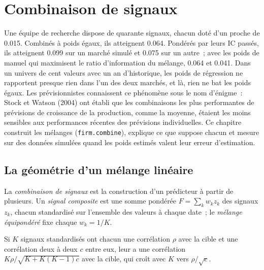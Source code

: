 \chapter{Combinaison de signaux}\label{ch:rs:signal-combination}

Une équipe de recherche dispose de quarante signaux, chacun doté d'un  proche de 0.015. Combinés à poids égaux, ils atteignent 0.064.
Pondérés par leurs IC passés, ils atteignent 0.099 sur un marché simulé et 0.075 sur un autre~; avec les poids de manuel qui maximisent le
ratio d'information du mélange, 0.064 et 0.041. Dans un univers de cent valeurs avec un an d'historique, les poids de régression ne rapportent presque rien dans l'un des deux
marchés, et là, rien ne bat les poids égaux. Les prévisionnistes connaissent ce phénomène sous le nom d'énigme~: Stock et Watson (2004) ont établi que les combinaisons les plus
performantes de prévisions de croissance de la production, comme la moyenne, étaient les moins sensibles aux performances récentes des
prévisions individuelles. Ce chapitre construit les mélanges (\texttt{firm.combine}), explique ce que suppose chacun et mesure sur des données simulées quand les
poids estimés valent leur erreur d'estimation.

\section{La géométrie d'un mélange linéaire}

\begin{definition}\label{def:rs:signal-combination:blend}
La \emph{combinaison de signaux} est la construction d'un prédicteur à partir de plusieurs. Un \emph{signal
composite} est une somme pondérée $F = \sum_k w_k z_k$ des signaux $z_k$, chacun standardisé sur l'ensemble des valeurs à chaque date~;
le \emph{mélange équipondéré} fixe chaque $w_k = 1/K$.
\end{definition}

\begin{proposition}\label{prop:rs:signal-combination:geometry}
Si $K$ signaux standardisés ont chacun une corrélation $\rho$ avec la cible et une corrélation deux à deux $c$ entre eux, leur 
a une corrélation $K\rho/\sqrt{K + K(K - 1)c}$ avec la cible, qui croît avec $K$ vers $\rho/\sqrt c$.
\end{proposition}

